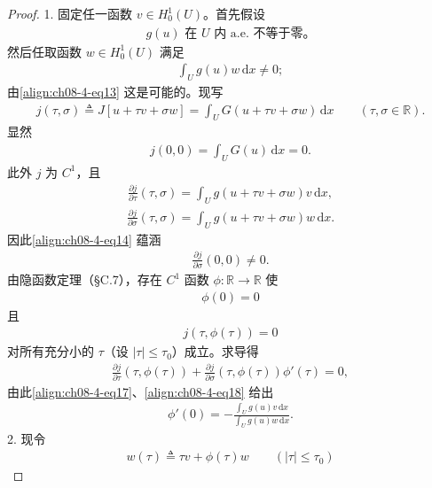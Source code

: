 \documentclass[../../main.tex]{subfiles}
\begin{document}
\begin{theorem}[Lagrange 乘子]
\begin{proof}
1. 固定任一函数 $v\in H_0^1(U)$。首先假设
\begin{align}
g(u)\text{ 在 }U\text{ 内 a.e. 不等于零。}\label{align:ch08-4-eq13}
\end{align}
然后任取函数 $w\in H_0^1(U)$ 满足
\begin{align}
\int_U g(u)w\,\mathrm{d}x\neq 0;\label{align:ch08-4-eq14}
\end{align}
由\eqref{align:ch08-4-eq13} 这是可能的。现写
\begin{align}
j(\tau,\sigma)\triangleq J[u+\tau v+\sigma w]=\int_U G(u+\tau v+\sigma w)\,\mathrm{d}x\qquad (\tau,\sigma\in\mathbb{R}).\label{align:ch08-4-eq15}
\end{align}
显然
\begin{align}
j(0,0)=\int_U G(u)\,\mathrm{d}x=0.\label{align:ch08-4-eq16}
\end{align}
此外 $j$ 为 $C^1$，且
\begin{align}
\frac{\partial j}{\partial\tau}(\tau,\sigma)=\int_U g(u+\tau v+\sigma w)v\,\mathrm{d}x,\label{align:ch08-4-eq17}
\end{align}
\begin{align}
\frac{\partial j}{\partial\sigma}(\tau,\sigma)=\int_U g(u+\tau v+\sigma w)w\,\mathrm{d}x.\label{align:ch08-4-eq18}
\end{align}
因此\eqref{align:ch08-4-eq14} 蕴涵
\begin{align}
\frac{\partial j}{\partial\sigma}(0,0)\neq 0.\label{align:ch08-4-eq19}
\end{align}
由隐函数定理（\S C.7），存在 $C^1$ 函数 $\phi:\mathbb{R}\to\mathbb{R}$ 使
\begin{align}
\phi(0)=0\label{align:ch08-4-eq20}
\end{align}
且
\begin{align}
j(\tau,\phi(\tau))=0\label{align:ch08-4-eq21}
\end{align}
对所有充分小的 $\tau$（设 $|\tau|\leqslant\tau_0$）成立。求导得
\begin{align*}
\frac{\partial j}{\partial\tau}(\tau,\phi(\tau))+\frac{\partial j}{\partial\sigma}(\tau,\phi(\tau))\phi'(\tau)=0,
\end{align*}
由此\eqref{align:ch08-4-eq17}、\eqref{align:ch08-4-eq18} 给出
\begin{align}
\phi'(0)=-\frac{\int_U g(u)v\,\mathrm{d}x}{\int_U g(u)w\,\mathrm{d}x}.\label{align:ch08-4-eq22}
\end{align}
2. 现令
\begin{align*}
w(\tau)\triangleq\tau v+\phi(\tau)w\qquad (|\tau|\leqslant\tau_0)

\end{align*}
\end{proof}
\end{theorem}
\end{document}
